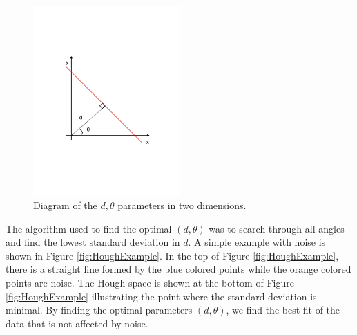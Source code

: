 \documentclass[final,number,sort&compress,5p,times,twocolumn]{elsarticle}
\begin{document}
\begin{figure}[hbt!]
	\centering
    \includegraphics[width=0.5\textwidth]{figures/HoughTransform}
    \caption{Diagram of the $d, \theta$ parameters in two dimensions.}
    \label{fig:HoughDiagram}
\end{figure}

The algorithm used to find the optimal $(d, \theta)$ was to search through all angles and find the lowest standard deviation in $d$. A simple example with noise is shown in Figure \ref{fig:HoughExample}. In the top of Figure \ref{fig:HoughExample}, there is a straight line formed by the blue colored points while the orange colored points are noise. The Hough space is shown at the bottom of Figure \ref{fig:HoughExample} illustrating the point where the standard deviation is minimal. By finding the optimal parameters $(d, \theta)$, we find the best fit of the data that is not affected by noise.
\end{document}
